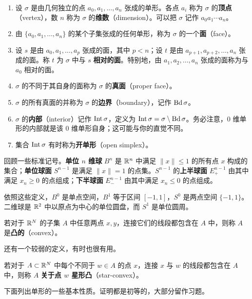 \begin{enumerate}[label=(\alph*)]
\item 设 $\sigma$ 是由几何独立的点 $a_0,a_1,\ldots,a_n$ 张成的单形。各点 $a_i$ 称为 $\sigma$ 的\textbf{顶点}（vertex），数 $n$ 称为 $\sigma$ 的\textbf{维数}（dimension）。可以把 $\sigma$ 记作 $a_0a_1\cdots a_n$。
\item 由 $\{a_0,a_1,\ldots,a_n\}$ 的某个子集张成的任何单形，称为 $\sigma$ 的一个\textbf{面}（face）。
\item 设 $s$ 是由 $a_0,a_1,\ldots,a_p$ 张成的面，其中 $p<n$；设 $t$ 是由 $a_{p+1},a_{p+2},\ldots,a_n$ 张成的面。称 $t$ 为 $\sigma$ 中与 $s$ \textbf{相对的面}。特别地，由 $a_1,a_2,\ldots,a_n$ 张成的面称为与 $a_0$ 相对的面。
\item $\sigma$ 的不同于其自身的面称为 $\sigma$ 的\textbf{真面}（proper face）。
\item $\sigma$ 的所有真面的并称为 $\sigma$ 的\textbf{边界}（boundary），记作 $\operatorname{Bd}\sigma$。
\item $\sigma$ 的\textbf{内部}（interior）记作 $\operatorname{Int}\sigma$，定义为 $\operatorname{Int}\sigma=\sigma\setminus\operatorname{Bd}\sigma$。务必注意，$0$ 维单形的内部就是该 $0$ 维单形自身；这可能与你的直觉不同。
\item 集合 $\operatorname{Int}\sigma$ 有时称为\textbf{开单形}（open simplex）。
\end{enumerate}
回顾一些标准记号。\textbf{单位 $n$ 维球} $B^n$ 是 $\mathbb{R}^n$ 中满足 $\|x\|\leq1$ 的所有点 $x$ 构成的集合；\textbf{单位球面} $S^{n-1}$ 是满足 $\|x\|=1$ 的点集。$S^{n-1}$ 的\textbf{上半球面} $E_+^{n-1}$ 由其中满足 $x_n\geq0$ 的点组成；\textbf{下半球面} $E_-^{n-1}$ 由其中满足 $x_n\leq0$ 的点组成。

依照这些定义，$B^0$ 是单点空间，$B^1$ 等于区间 $[-1,1]$，$S^0$ 是两点空间 $\{-1,1\}$。二维球是 $\mathbb{R}^2$ 中以原点为中心的单位圆盘，而 $S^1$ 是单位圆周。

若对于 $\mathbb{R}^N$ 的子集 $A$ 中任意两点 $x,y$，连接它们的线段都包含在 $A$ 中，则称 $A$ 是\textbf{凸的}（convex）。

还有一个较弱的定义，有时也很有用。

若对于 $A\subset\mathbb{R}^N$ 中每个不同于 $w\in A$ 的点 $x$，连接 $x$ 与 $w$ 的线段都包含在 $A$ 中，则称 $A$ \textbf{关于点 $w$ 星形凸}（star-convex）。

下面列出单形的一些基本性质。证明都是初等的，大部分留作习题。

